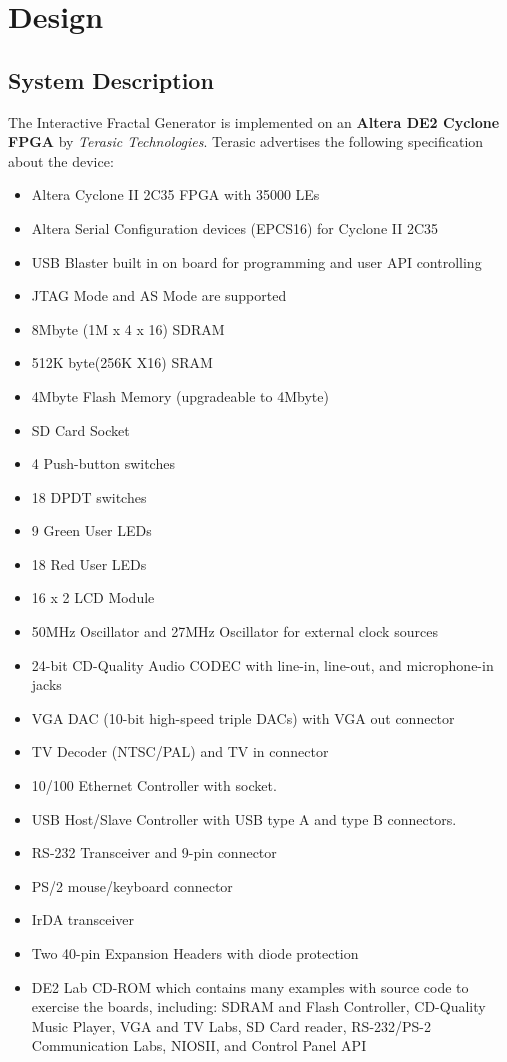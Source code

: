 \documentclass{article}
\begin{document}
\section{Design}

\subsection{System Description}
The Interactive Fractal Generator is implemented on an \textbf{Altera DE2 Cyclone FPGA} by \textit{Terasic Technologies}. Terasic advertises the following specification about the device:

\begin{itemize}
\item Altera Cyclone II 2C35 FPGA with 35000 LEs
\item Altera Serial Configuration devices (EPCS16) for Cyclone II 2C35
\item USB Blaster built in on board for programming and user API controlling
\item JTAG Mode and AS Mode are supported
\item 8Mbyte (1M x 4 x 16) SDRAM
\item 512K byte(256K X16) SRAM
\item 4Mbyte Flash Memory (upgradeable to 4Mbyte)
\item SD Card Socket
\item 4 Push-button switches
\item 18 DPDT switches
\item 9 Green User LEDs
\item 18 Red User LEDs
\item 16 x 2 LCD Module
\item 50MHz Oscillator and 27MHz Oscillator for external clock sources
\item 24-bit CD-Quality Audio CODEC with line-in, line-out, and microphone-in jacks
\item VGA DAC (10-bit high-speed triple DACs) with VGA out connector
\item TV Decoder (NTSC/PAL) and TV in connector
\item 10/100 Ethernet Controller with socket.
\item USB Host/Slave Controller with USB type A and type B connectors.
\item RS-232 Transceiver and 9-pin connector
\item PS/2 mouse/keyboard connector
\item IrDA transceiver
\item Two 40-pin Expansion Headers with diode protection
\item DE2 Lab CD-ROM which contains many examples with source code to exercise the boards, including: SDRAM and Flash Controller, CD-Quality Music Player, VGA and TV Labs, SD Card reader, RS-232/PS-2 Communication Labs, NIOSII, and Control Panel API
\end{itemize}
\end{document}
